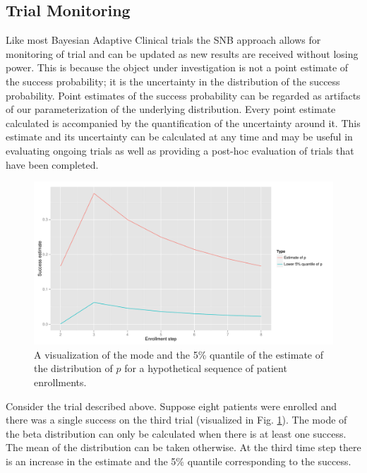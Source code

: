 \documentclass[12pt]{article}         %
\begin{document}
\subsection{Trial Monitoring}

Like most Bayesian Adaptive Clinical trials the SNB approach allows for monitoring of trial and can be updated as new results are received without losing 
power. This is because the object under investigation is not a point estimate 
of the success probability; it is the uncertainty in the distribution of the 
success probability. Point estimates of the success probability can be 
regarded as artifacts of our parameterization of the underlying distribution. 
Every point estimate calculated is accompanied by the quantification of the 
uncertainty around it. This estimate and its uncertainty can be calculated at 
any time and may be useful in evaluating ongoing trials as well as providing a 
post-hoc evaluation of trials that have been completed.

\begin{figure}[ht]
\includegraphics[width=\textwidth]{hypo_traj.pdf}
\caption{
A visualization of the mode and the 5\% quantile of the estimate of the distribution of $p$ for a hypothetical sequence of patient enrollments.
}
\label{fig:hypo}
\end{figure}

Consider the trial described above. Suppose eight patients were enrolled and 
there was a single success on the third trial (visualized in Fig. 
\ref{fig:hypo}). The mode of the beta distribution can only be calculated when 
there is at least one success. The mean of the distribution can be
taken otherwise. At the third time step there is an increase in the estimate and the 5\% quantile corresponding to the success. 
\end{document}

